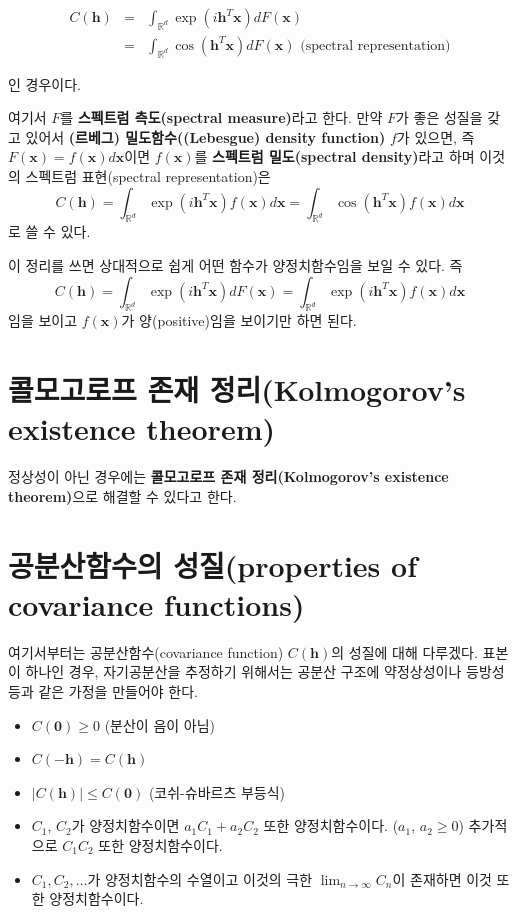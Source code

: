 \documentclass[b5paper,]{scrbook}
\theoremstyle{plain}
\theoremstyle{definition}
\numberwithin{equation}{section}
\begin{document}
\begin{eqnarray}
C(\mathbf{h})&=&\int_{\mathbb{R}^{d}}\exp(i\mathbf{h}^{T}\mathbf{x})dF(\mathbf{x})\nonumber\\
&=&\int_{\mathbb{R}^{d}}\cos(\mathbf{h}^{T}\mathbf{x})dF(\mathbf{x}) \text{ (spectral representation)}
\end{eqnarray}

인 경우이다.

여기서 \(F\)를 \textbf{스펙트럼 측도(spectral measure)}라고 한다. 만약 \(F\)가 좋은 성질을 갖고 있어서 \textbf{(르베그) 밀도함수((Lebesgue) density function)} \(f\)가 있으면, 즉 \(F(\mathbf{x})=f(\mathbf{x})d\mathbf{x}\)이면 \(f(\mathbf{x})\)를 \textbf{스펙트럼 밀도(spectral density)}라고 하며 이것의 스펙트럼 표현(spectral representation)은
\[
C(\mathbf{h})=\int_{\mathbb{R}^{d}}\exp(i\mathbf{h}^{T}\mathbf{x})f(\mathbf{x})d\mathbf{x}=\int_{\mathbb{R}^{d}}\cos(\mathbf{h}^{T}\mathbf{x})f(\mathbf{x})d\mathbf{x}
\]
로 쓸 수 있다.

이 정리를 쓰면 상대적으로 쉽게 어떤 함수가 양정치함수임을 보일 수 있다. 즉
\[
C(\mathbf{h}) =\int_{\mathbb{R}^{d}}\exp(i\mathbf{h}^{T}\mathbf{x})dF(\mathbf{x})
=\int_{\mathbb{R}^{d}}\exp(i\mathbf{h}^{T}\mathbf{x})f(\mathbf{x})d\mathbf{x}
\]
임을 보이고 \(f(\mathbf{x})\)가 양(positive)임을 보이기만 하면 된다.

\hypertarget{--kolmogorovs-existence-theorem}{%
\section{콜모고로프 존재 정리(Kolmogorov's existence theorem)}\label{--kolmogorovs-existence-theorem}}

정상성이 아닌 경우에는 \textbf{콜모고로프 존재 정리(Kolmogorov's existence theorem)}으로 해결할 수 있다고 한다.

\hypertarget{-properties-of-covariance-functions}{%
\section{공분산함수의 성질(properties of covariance functions)}\label{-properties-of-covariance-functions}}

여기서부터는 공분산함수(covariance function) \(C(\mathbf{h})\)의 성질에 대해 다루겠다. 표본이 하나인 경우, 자기공분산을 추정하기 위해서는 공분산 구조에 약정상성이나 등방성 등과 같은 가정을 만들어야 한다.

\begin{itemize}
\item
  \(C(\mathbf{0}) \geq 0\) (분산이 음이 아님)
\item
  \(C(\mathbf{-h})=C(\mathbf{h})\)
\item
  \(|C(\mathbf{h})| \leq C(\mathbf{0})\) (코쉬-슈바르츠 부등식)
\item
  \(C_{1}\), \(C_{2}\)가 양정치함수이면 \(a_{1}C_{1}+a_{2}C_{2}\) 또한 양정치함수이다. (\(a_{1}\), \(a_{2} \geq 0\)) 추가적으로 \(C_{1}C_{2}\) 또한 양정치함수이다.
\item
  \(C_{1}, C_{2}, \ldots\)가 양정치함수의 수열이고 이것의 극한 \(\lim_{n \rightarrow \infty}C_{n}\)이 존재하면 이것 또한 양정치함수이다.
\end{itemize}
\end{document}
